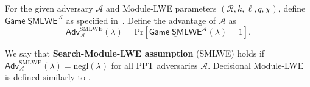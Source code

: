 \documentclass{template}
\begin{document}
\begin{definition}
    For the given adversary $\mathcal{A}$ and Module-LWE parameters
    $(\mathcal{R},k,\ell,q,\chi)$, define $\underline{\mathsf{Game} \;
    \mathsf{SMLWE}}^{\mathcal{A}}$ as specified in~. Define
    the advantage of $\mathcal{A}$ as
    \begin{equation*}
        \mathsf{Adv}^{\text{SMLWE}}_{\mathcal{A}}(\lambda) = \text{Pr}\left[\underline{\mathsf{Game} \;
    \mathsf{SMLWE}}^{\mathcal{A}}(\lambda) = 1\right].
    \end{equation*}

    We say that \textbf{Search-Module-LWE assumption} (SMLWE) holds if
    $\mathsf{Adv}^{\text{SMLWE}}_{\mathcal{A}}(\lambda)=\text{negl}(\lambda)$
    for all PPT adversaries $\mathcal{A}$. Decisional Module-LWE is defined
    similarly to .
\end{definition}
\end{document}
